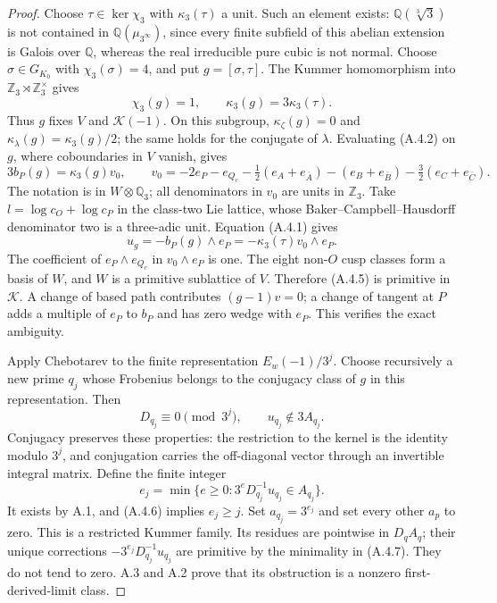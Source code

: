 \begin{proof}
Choose $\tau\in\ker\chi_3$ with $\kappa_3(\tau)$ a unit. Such an
element exists: $\mathbb Q(\sqrt[3]{3})$ is not contained in
$\mathbb Q(\mu_{3^\infty})$, since every finite subfield of this
abelian extension is Galois over $\mathbb Q$, whereas the real
irreducible pure cubic is not normal. Choose $\sigma\in G_{K_0}$
with $\chi_3(\sigma)=4$, and put $g=[\sigma,\tau]$. The Kummer
homomorphism into $\mathbb Z_3\rtimes\mathbb Z_3^\times$ gives
\[
 \chi_3(g)=1,\qquad\kappa_3(g)=3\kappa_3(\tau).
 \tag{A.4.3}
\]
Thus $g$ fixes $V$ and $\mathcal K(-1)$. On this subgroup,
$\kappa_\zeta(g)=0$ and
$\kappa_\lambda(g)=\kappa_3(g)/2$; the same holds for the conjugate
of $\lambda$. Evaluating (A.4.2) on $g$, where coboundaries in $V$
vanish, gives
\[
 3b_P(g)=\kappa_3(g)v_0,
 \qquad
 v_0=-2e_P-e_{Q_c}
 -\tfrac12(e_A+e_{\bar A})-(e_B+e_{\bar B})
 -\tfrac32(e_C+e_{\bar C}).
 \tag{A.4.4}
\]
The notation is in $W\otimes\mathbb Q_3$; all denominators in
$v_0$ are units in $\mathbb Z_3$.
Take $l=\log c_O+\log c_P$ in the class-two Lie lattice, whose
Baker--Campbell--Hausdorff denominator two is a three-adic unit.
Equation (A.4.1) gives
\[
 u_g=-b_P(g)\wedge e_P
     =-\kappa_3(\tau)v_0\wedge e_P.
 \tag{A.4.5}
\]
The coefficient of $e_P\wedge e_{Q_c}$ in $v_0\wedge e_P$ is one.
The eight non-$O$ cusp classes form a basis of $W$, and $W$ is a
primitive sublattice of $V$. Therefore (A.4.5) is primitive in
$\mathcal K$. A change of based path contributes $(g-1)v=0$;
a change of tangent at $P$ adds a multiple of $e_P$ to $b_P$ and
has zero wedge with $e_P$. This verifies the exact ambiguity.

Apply Chebotarev \cite[V.3.23]{MilneCFT} to the finite representation $E_w(-1)/3^j$.
Choose recursively a new prime $q_j$ whose Frobenius belongs to
the conjugacy class of $g$ in this representation. Then
\[
 D_{q_j}\equiv0\pmod{3^j},\qquad u_{q_j}\notin3A_{q_j}.
 \tag{A.4.6}
\]
Conjugacy preserves these properties: the restriction to the
kernel is the identity modulo $3^j$, and conjugation carries the
off-diagonal vector through an invertible integral matrix.
Define the finite integer
\[
 e_j=\min\{e\ge0:3^eD_{q_j}^{-1}u_{q_j}\in A_{q_j}\}.
 \tag{A.4.7}
\]
It exists by A.1, and (A.4.6) implies $e_j\ge j$. Set
$a_{q_j}=3^{e_j}$ and set every other $a_p$ to zero. This is a
restricted Kummer family. Its residues are pointwise in $D_qA_q$;
their unique corrections
$-3^{e_j}D_{q_j}^{-1}u_{q_j}$ are primitive by the minimality in
(A.4.7). They do not tend to zero. A.3 and A.2 prove that its
obstruction is a nonzero first-derived-limit class.


\end{proof}
